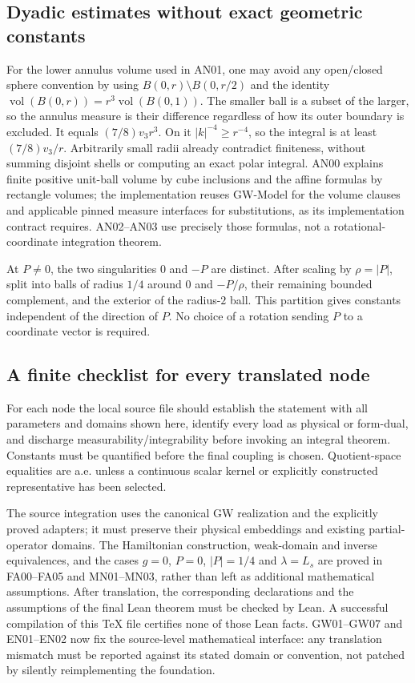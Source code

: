 \documentclass[11pt,a4paper]{article}
\theoremstyle{remark}\newtheorem{remark}[theorem]{Remark}
\newcommand{\abs}[1]{\lvert #1\rvert}\newcommand{\rankone}[2]{\lvert #1\rangle\langle #2\rvert}
\begin{document}
\subsection{Dyadic estimates without exact geometric constants}
For the lower annulus volume used in AN01, one may avoid any open/closed sphere convention by using
$B(0,r)\setminus B(0,r/2)$ and the identity
$\operatorname{vol}(B(0,r))=r^3\operatorname{vol}(B(0,1))$.
The smaller ball is a subset of the larger, so the annulus measure is their difference regardless of how its outer boundary is excluded. It equals $(7/8)v_3r^3$. On it $\abs k^{-4}\geq r^{-4}$, so the integral is at least $(7/8)v_3/r$. Arbitrarily small radii already contradict finiteness, without summing disjoint shells or computing an exact polar integral. AN00 explains finite positive unit-ball volume by cube inclusions and the affine formulas by rectangle volumes; the implementation reuses GW-Model for the volume clauses and applicable pinned measure interfaces for substitutions, as its implementation contract requires. AN02--AN03 use precisely those formulas, not a rotational-coordinate integration theorem.

At $P\ne0$, the two singularities $0$ and $-P$ are distinct. After scaling by $\rho=\abs P$, split into balls of radius $1/4$ around $0$ and $-P/\rho$, their remaining bounded complement, and the exterior of the radius-$2$ ball. This partition gives constants independent of the direction of $P$. No choice of a rotation sending $P$ to a coordinate vector is required.

\subsection{A finite checklist for every translated node}
For each node the local source file should establish the statement with all parameters and domains shown here, identify every load as physical or form-dual, and discharge measurability/integrability before invoking an integral theorem. Constants must be quantified before the final coupling is chosen. Quotient-space equalities are a.e. unless a continuous scalar kernel or explicitly constructed representative has been selected.

The source integration uses the canonical GW realization and the explicitly proved adapters; it must preserve their physical embeddings and existing partial-operator domains. The Hamiltonian construction, weak-domain and inverse equivalences, and the cases $g=0$, $P=0$, $\abs P=1/4$ and $\lambda=L_s$ are proved in FA00--FA05 and MN01--MN03, rather than left as additional mathematical assumptions. After translation, the corresponding declarations and the assumptions of the final Lean theorem must be checked by Lean. A successful compilation of this TeX file certifies none of those Lean facts. GW01--GW07 and EN01--EN02 now fix the source-level mathematical interface: any translation mismatch must be reported against its stated domain or convention, not patched by silently reimplementing the foundation.
\end{document}

